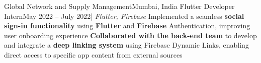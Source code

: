     \resumeSubheading
      {Global Network and Supply Management}{Mumbai, India}
      {Flutter Developer Intern}{May 2022 -- July 2022}{| \textit{Flutter, Firebase}}
      \resumeItemListStart
        {Implemented a seamless \textbf{social sign-in functionality} using \textbf{Flutter} and \textbf{Firebase} Authentication, improving user onboarding experience}
        {\textbf{Collaborated with the back-end team} to develop and integrate a \textbf{deep linking system} using Firebase Dynamic Links, enabling direct access to specific app content from external sources}
      \resumeItemListEnd